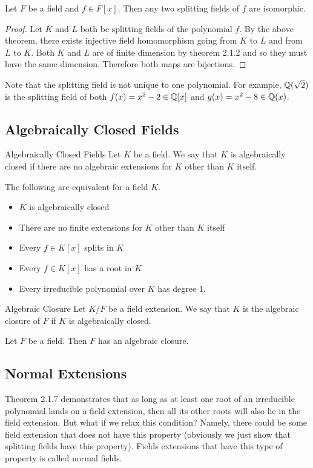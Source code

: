 \documentclass[a4paper]{article}
\begin{document}
\begin{crl}{}{} Let $F$ be a field and $f\in F[x]$. Then any two splitting fields of $f$ are isomorphic. 
\begin{proof}
Let $K$ and $L$ both be splitting fields of the polynomial $f$. By the above theorem, there exists injective field homomorphism going from $K$ to $L$ and from $L$ to $K$. Both $K$ and $L$ are of finite dimension by theorem 2.1.2 and so they must have the same dimension. Therefore both maps are bijections. 
\end{proof}
\end{crl}

Note that the splitting field is not unique to one polynomial. For example, $\mathbb{Q}(\sqrt{2})$ is the splitting field of both $f(x)=x^2-2\in\mathbb{Q}[x]$ and $g(x)=x^2-8\in\mathbb{Q}(x)$. 

\subsection{Algebraically Closed Fields}
\begin{defn}{Algebraically Closed Fields}{} Let $K$ be a field. We say that $K$ is algebraically closed if there are no algebraic extensions for $K$ other than $K$ itself. 
\end{defn}

\begin{lmm}{}{} The following are equivalent for a field $K$. 
\begin{itemize}
\item $K$ is algebraically closed
\item There are no finite extensions for $K$ other than $K$ itself
\item Every $f\in K[x]$ splits in $K$
\item Every $f\in K[x]$ has a root in $K$\
\item Every irreducible polynomial over $K$ has degree $1$. 
\end{itemize}
\end{lmm}

\begin{defn}{Algebraic Closure}{} Let $K/F$ be a field extension. We say that $K$ is the algebraic closure of $F$ if $K$ is algebraically closed. 
\end{defn}

\begin{prp}{}{} Let $F$ be a field. Then $F$ has an algebraic closure. 
\end{prp}

\subsection{Normal Extensions}
Theorem 2.1.7 demonstrates that as long as at least one root of an irreducible polynomial lands on a field extension, then all its other roots will also lie in the field extension. But what if we relax this condition? Namely, there could be some field extension that does not have this property (obviously we just show that splitting fields have this property). Fields extensions that have this type of property is called normal fields. 
\end{document}
